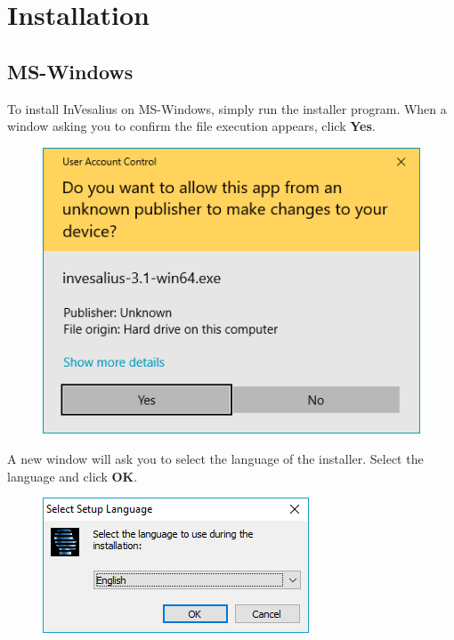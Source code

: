 \chapter{Installation}

\section{MS-Windows}


To install InVesalius on MS-Windows, simply run the installer program. When a window asking you to confirm the file execution appears, click \textbf{Yes}.

\begin{figure}[!htb]
\centering
\includegraphics[scale=0.5]{../user_guide_figures/invesalius_screen/installation_exec_en.png}
\end{figure}

\newpage

A new window will ask you to select the language of the installer. Select the language and click \textbf{OK}.

\begin{figure}[!htb]
\centering
\includegraphics[scale=0.7]{../user_guide_figures/invesalius_screen/installation_select_language_en.png}
\end{figure}
 
